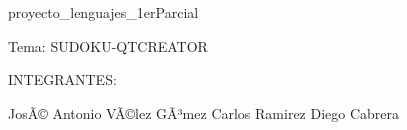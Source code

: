 proyecto\-\_\-lenguajes\-\_\-1er\-Parcial

Tema\-: S\-U\-D\-O\-K\-U-\/\-Q\-T\-C\-R\-E\-A\-T\-O\-R

I\-N\-T\-E\-G\-R\-A\-N\-T\-E\-S\-:

JosÃ© Antonio VÃ©lez GÃ³mez Carlos Ramirez Diego Cabrera 